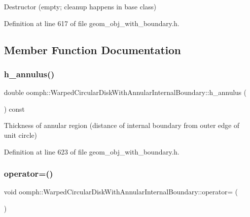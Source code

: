 Destructor (empty; cleanup happens in base class) 



Definition at line 617 of file geom\+\_\+obj\+\_\+with\+\_\+boundary.\+h.



\subsection{Member Function Documentation}
\mbox{\label{classoomph_1_1WarpedCircularDiskWithAnnularInternalBoundary_aaa718ad4761397bd44aaac093ed35a9f}} 
\subsubsection{\texorpdfstring{h\+\_\+annulus()}{h\_annulus()}}
{\footnotesize\ttfamily double oomph\+::\+Warped\+Circular\+Disk\+With\+Annular\+Internal\+Boundary\+::h\+\_\+annulus (\begin{DoxyParamCaption}{ }\end{DoxyParamCaption}) const\hspace{0.3cm}{\ttfamily [inline]}}



Thickness of annular region (distance of internal boundary from outer edge of unit circle) 



Definition at line 623 of file geom\+\_\+obj\+\_\+with\+\_\+boundary.\+h.

\mbox{\label{classoomph_1_1WarpedCircularDiskWithAnnularInternalBoundary_a7f7cbd42f9399bfff46f5c4cc07218e5}} 
\subsubsection{\texorpdfstring{operator=()}{operator=()}}
{\footnotesize\ttfamily void oomph\+::\+Warped\+Circular\+Disk\+With\+Annular\+Internal\+Boundary\+::operator= (\begin{DoxyParamCaption}\item[{const \hyperlink{classoomph_1_1WarpedCircularDiskWithAnnularInternalBoundary}{Warped\+Circular\+Disk\+With\+Annular\+Internal\+Boundary} \&}]{ }\end{DoxyParamCaption})\hspace{0.3cm}{\ttfamily [inline]}}



